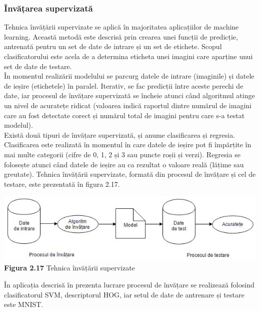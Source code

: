 \documentclass[a4paper,12pt]{report}
\newcommand\tab[1][1cm]{\hspace*{#1}}
\begin{document}
\subsection{Învățarea supervizată}
\tab Tehnica învățării supervizate\cite{wikip4} se aplică în majoritatea aplicațiilor de machine learning. Această metodă este descrisă prin crearea unei funcții de predicție, antrenată pentru un set de date de intrare și un set de etichete. Scopul clasificatorului este acela de a determina eticheta unei imagini care aparține unui set de date de testare. 
\\ \tab În momentul realizării modelului se parcurg datele de intrare (imaginile) și datele de ieșire (etichetele) în paralel. Iterativ, se fac predicții între aceste perechi de date, iar procesul de învățare supervizată se încheie atunci când algoritmul atinge un nivel de acuratețe ridicat (valoarea indică raportul dintre numărul de imagini care au fost detectate corect și numărul total de imagini pentru care s-a testat modelul). 
\\ \tab Există două tipuri de învățare supervizată, și anume clasificarea și regresia. Clasificarea este realizată în momentul în care datele de ieșire pot fi împărțite în mai multe categorii (cifre de 0, 1, 2 și 3 sau puncte roșii și verzi). Regresia se folosește atunci când datele de ieșire au ca rezultat o valoare reală (lățime sau greutate). Tehnica învățării supervizate, formată din procesul de învățare și cel de testare, este prezentată în figura 2.17.
\begin {center} 
	\begin {footnotesize} 
		\includegraphics[width = 155mm]{fig2_17} \\
		\textbf  {Figura 2.17} Tehnica învățării supervizate
	\end {footnotesize} 
\end {center}
\tab În aplicația descrisă în prezenta lucrare procesul de învățare se realizează folosind clasificatorul SVM, descriptorul HOG, iar setul de date de antrenare și testare este MNIST. 

\chapter*{}
\end{document}
